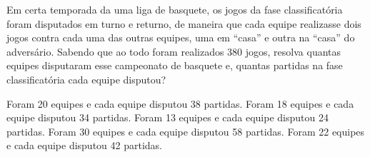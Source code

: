 Em certa temporada da uma liga de basquete, os jogos da fase classificatória foram disputados em turno e returno, de maneira que cada equipe realizasse dois jogos contra cada uma das outras equipes, uma em ``casa'' e outra na ``casa'' do adversário. Sabendo que ao todo foram realizados 380 jogos, resolva quantas equipes disputaram esse campeonato de basquete e, quantas partidas na fase classificatória cada equipe disputou?

Foram 20 equipes e cada equipe disputou 38 partidas.
Foram 18 equipes e cada equipe disputou 34 partidas.
Foram 13 equipes e cada equipe disputou 24 partidas.
Foram 30 equipes e cada equipe disputou 58 partidas.
Foram 22 equipes e cada equipe disputou 42 partidas.



